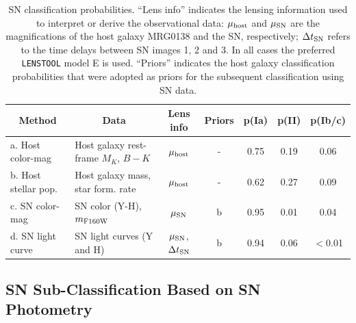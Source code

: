 \documentclass[12pt,dvipsnames]{article}
\def\lenstool{{\tt LENSTOOL}\xspace}
\begin{document}
\begin{table}[tb]
    \centering
    \begin{tabular}{lp{1.5in}cc|ccc}
        \multicolumn{1}{c}{Method} & \multicolumn{1}{c}{Data} & Lens info & Priors & p(Ia) & p(II) & p(Ib/c) \\
        \midrule
        a. Host color-mag & Host galaxy rest-frame $M_K$, $B-K$ & $\mu_{\rm host}$ & - & 0.75 & 0.19 & 0.06\\
        b. Host stellar pop. & Host galaxy mass, star form. rate & $\mu_{\rm host}$ & - & 0.62 & 0.27 & 0.09 \\
        c. SN color-mag & SN color (Y-H), $m_{\rm F160W}$ & $\mu_{\rm SN}$ & b & 0.95 & 0.01 & 0.04\\
        d. SN light curve & SN light curves (Y and H) & $\mu_{\rm SN}$, $\Delta t_{\rm SN}$ & b & 0.94 & 0.06 & $<$0.01 \\
    \end{tabular}
    \caption{SN classification probabilities. ``Lens info'' indicates the lensing information used to interpret or derive the 
    observational data: $\mu_{\rm host}$ and $\mu_{\rm SN}$ are the magnifications of the host galaxy MRG0138 and the SN, respectively; $\Delta t_{\rm SN}$ refers to the time delays between SN images 1, 2 and 3. In all cases the preferred \lenstool model E is used.  ``Priors'' indicates the host galaxy classification probabilities that were adopted as priors for the subsequent classification using SN data.}
    \label{tab:classification}
\end{table}


\subsection*{SN Sub-Classification Based on SN Photometry}
\end{document}

